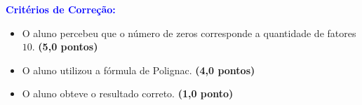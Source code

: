 \documentclass[12pt, a4paper]{article}
\newenvironment{criterios}[1][]{
 \textcolor{blue}{\bf Critérios de Correção:} \rmfamily \par\medskip #1 }{\medskip }
\begin{document}
\begin{mdframed}[style=Criterios]
\begin{criterios}
\begin{itemize}
    \item O aluno percebeu que o número de zeros corresponde a quantidade de fatores $10$. \textbf{(5,0 pontos)}
    \item O aluno utilizou a fórmula de Polignac. \textbf{(4,0 pontos)}
    \item O aluno obteve o resultado correto. \textbf{(1,0 ponto)}
\end{itemize}
\end{criterios}
\end{mdframed}

\end{document}
